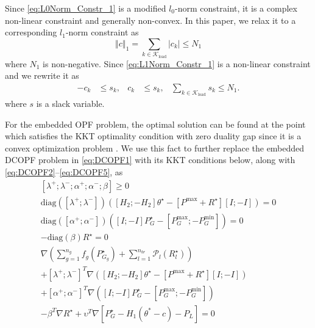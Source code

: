 \documentclass[twocolumn,english,final,journal]{IEEEtran}
\theoremstyle{plain}
\theoremstyle{definition}
\begin{document}
Since \eqref{eq:L0Norm_Constr_1} is a modified $l_{0}$-norm constraint,
it is a complex non-linear constraint and generally non-convex. In
this paper, we relax it to a corresponding $l_{1}$-norm constraint
as
\begin{equation}
\left\Vert c\right\Vert _{1}=\sum_{k\in\mathcal{K}_{\textrm{load}}}\left|c_{k}\right|\leq N_{1}\label{eq:L1Norm_Constr_1}
\end{equation}
where $N_{1}$ is non-negative. Since \eqref{eq:L1Norm_Constr_1}
is a non-linear constraint and we rewrite it as
\begin{align}
-c_{k} & \leq s_{k},  &  c_{k} & \leq s_{k}, & \sum_{k\in\mathcal{K}_{\textrm{load}}}s_{k}\leq N_{1}.\label{eq:N1}
\end{align}
where $s$ is a slack variable.

For the embedded OPF problem, the optimal solution can be found at
the point which satisfies the KKT optimality condition with zero duality
gap since it is a convex optimization problem . We use
this fact to further replace the embedded DCOPF problem in \eqref{eq:DCOPF1}
with its KKT conditions below, along with \eqref{eq:DCOPF2}--\eqref{eq:DCOPF5},
as 
\begin{gather}
\left[\lambda^{+};\lambda^{-};\alpha^{+};\alpha^{-};\beta\right]\geq0\label{eq:Dual>0}\\
\mbox{diag}\left(\left[\lambda^{+};\lambda^{-}\right]\right)\left(\left[H_{2};-H_{2}\right]\theta^{\star}-\left[P^{\max}+R^{\star}\right]\left[I;-I\right]\right)=0\label{eq:ComplementarySlack1}\\
\mbox{diag}\left(\left[\alpha^{+};\alpha^{-}\right]\right)\left(\left[I;-I\right]P_{G}^{\star}-\left[P_{G}^{\max};-P_{G}^{\min}\right]\right)=0\\
-\mbox{diag}(\beta)R^{\star}=0\label{eq:ComplementarySlack2}\\
\nabla({\displaystyle \sum_{g=1}^{n_{g}}f_{g}(P_{G_{g}}^{\star})}+{\displaystyle \sum_{l=1}^{n_{br}}\mathcal{P}_{l}(R_{l}^{\star})})\nonumber \\
+\left[\lambda^{+};\lambda^{-}\right]^{T}\nabla\left(\left[H_{2};-H_{2}\right]\theta^{\star}-\left[P^{\max}+R^{\star}\right]\left[I;-I\right]\right)\nonumber \\
+\left[\alpha^{+};\alpha^{-}\right]^{T}\nabla\left(\left[I;-I\right]P_{G}^{\star}-\left[P_{G}^{\max};-P_{G}^{\min}\right]\right)\label{eq:PartialGradient}\\
-\beta^{T}\nabla R^{\star}+\upsilon^{T}\nabla[P_{G}^{\star}-H_{1}(\theta^{*}-c)-P_{L}]=0\nonumber 
\end{gather}
\end{document}
